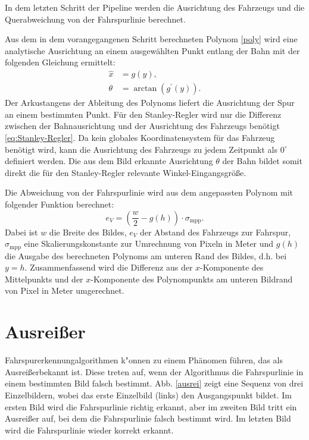 \documentclass[arbeit=studie,oneside,BCOR=12mm]{ArbeitRST}
\begin{document}
In dem letzten Schritt der Pipeline werden die Ausrichtung des Fahrzeugs und die Querabweichung von
der Fahrspurlinie berechnet. 

Aus dem in dem vorangegangenen Schritt berechneten Polynom \eqref{poly} wird eine
analytische Ausrichtung an einem ausgewählten Punkt entlang der Bahn mit der
folgenden Gleichung \cite{tangentangle} ermittelt:
\begin{subequations} 
    \begin{align}
        \hat{x} &= g(y), \\
        \theta &= \arctan(g^\prime(y)).
    \end{align}
\end{subequations} 
Der Arkustangens der Ableitung des Polynoms liefert die Ausrichtung der Spur
an einem bestimmten Punkt. Für den Stanley-Regler wird nur die Differenz
zwischen der Bahnausrichtung und der Ausrichtung des Fahrzeugs benötigt \eqref{eq:Stanley-Regler}. Da
kein globales Koordinatensystem für das Fahrzeug benötigt wird, kann die
Ausrichtung des Fahrzeugs zu jedem Zeitpunkt als $0^{\circ}$ definiert
werden. Die aus dem Bild erkannte Ausrichtung $\theta$ der Bahn bildet somit
direkt die für den Stanley-Regler relevante Winkel-Eingangsgröße.

Die Abweichung von der Fahrspurlinie wird aus dem angepassten Polynom mit
folgender Funktion berechnet: 
\begin{equation}
    e_{V} = \left(\frac{w}{2} - g(h)\right)\cdot \sigma_\mathrm{mpp}.
\end{equation}
Dabei ist $w$ die Breite des Bildes, $e_{V}$ der Abstand des Fahrzeugs zur
Fahrspur, $\sigma_\mathrm{mpp}$ eine Skalierungskonstante zur Umrechnung von
Pixeln in Meter und $g(h)$ die Ausgabe des berechneten Polynoms am unteren Rand
des Bildes, d.h. bei $y=h$. Zusammenfassend wird die Differenz aus der
$x$-Komponente des Mittelpunkts und der $x$-Komponente des Polynompunkts am
unteren Bildrand von Pixel in Meter umgerechnet.

\section{Ausrei{\ss}er}

Fahrspurerkennungalgorithmen k"onnen zu einem Phänomen führen, das als \glqq
Ausreißer\grqq bekannt ist. Diese treten auf, wenn der Algorithmus die
Fahrspurlinie in einem bestimmten Bild falsch bestimmt. Abb. \ref{ausrei} zeigt
eine Sequenz von drei Einzelbildern, wobei das erste Einzelbild (links) den
Ausgangspunkt bildet. Im ersten Bild wird die Fahrspurlinie richtig erkannt,
aber im zweiten Bild tritt ein Ausreißer auf, bei dem die Fahrspurlinie falsch
bestimmt wird. Im letzten Bild wird die Fahrspurlinie wieder korrekt erkannt.
\end{document}
